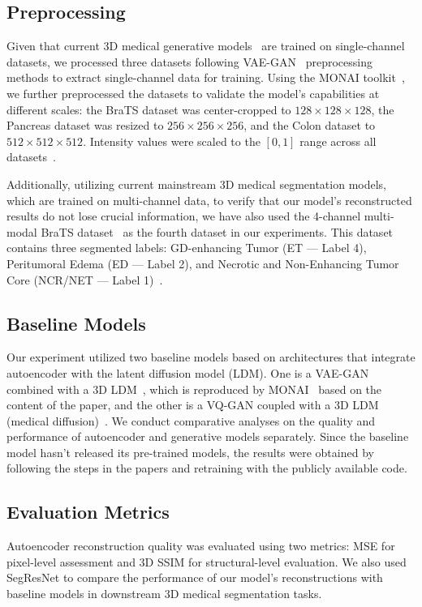 \documentclass[letterpaper]{article} %
\begin{document}
\subsection{Preprocessing}
Given that current 3D medical generative models~\cite{Pinaya2022BrainIG,Khader2022MedicalDD,liu2023inflating,friedrich2024wdm} are trained on single-channel datasets, we processed three datasets following VAE-GAN~\cite{Pinaya2022BrainIG} preprocessing methods to extract single-channel data for training. Using the MONAI toolkit~\cite{monai2020project}, we further preprocessed the datasets to validate the model's capabilities at different scales: the BraTS dataset was center-cropped to $128\times128\times128$, the Pancreas dataset was resized to $256\times256\times256$, and the Colon dataset to $512\times512\times512$. Intensity values were scaled to the $[0,1]$ range across all datasets~\cite{Simpson2019ALA}.

Additionally, utilizing current mainstream 3D medical segmentation models, which are trained on multi-channel data, to verify that our model's reconstructed results do not lose crucial information, we have also used the 4-channel multi-modal BraTS dataset~\cite{menze2014,Simpson2019ALA} as the fourth dataset in our experiments. This dataset contains three segmented labels: GD-enhancing Tumor (ET — Label 4), Peritumoral Edema (ED — Label 2), and Necrotic and Non-Enhancing Tumor Core (NCR/NET — Label 1)~\cite{menze2014multimodal,bakas2018identifying}.

\subsection{Baseline Models}
Our experiment utilized two baseline models based on architectures that integrate autoencoder with the latent diffusion model (LDM). One is a VAE-GAN combined with a 3D LDM~\cite{Rombach2021HighResolutionIS,Pinaya2022BrainIG}, which is reproduced by MONAI~\cite{monai2020project} based on the content of the paper, and the other is a VQ-GAN coupled with a 3D LDM (medical diffusion)~\cite{Khader2022MedicalDD}. We conduct comparative analyses on the quality and performance of autoencoder and generative models separately. Since the baseline model hasn't released its pre-trained models, the results were obtained by following the steps in the papers and retraining with the publicly available code.

\subsection{Evaluation Metrics}
Autoencoder reconstruction quality was evaluated using two metrics: MSE for pixel-level assessment and 3D SSIM \cite{Wang2004ImageQA} for structural-level evaluation. We also used SegResNet \cite{myronenko20193d} to compare the performance of our model's reconstructions with baseline models in downstream 3D medical segmentation tasks.
\end{document}
